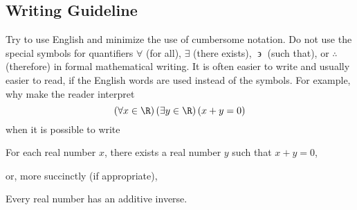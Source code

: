 \subsection*{Writing Guideline}
%
Try to use English and minimize the use of cumbersome notation.  Do not use the special symbols for quantifiers $\forall$ (for all), 
$\exists$ (there exists), $\mathrel\backepsilon$ (such that), or $\therefore $ (therefore) in formal mathematical writing.  It is often easier to write and usually easier to read, if the English words are used instead of the symbols.  For example, why make the reader interpret
\[
\left( \forall x \in \R \right) \left( \exists y \in \R \right)\left( x + y = 0 \right)
\]
when it is possible to write
\begin{center}
For each real number $x$, there exists a real number $y$ such that $x + y = 0$,
\end{center}
or, more succinctly (if appropriate),
\begin{center}
Every real number has an additive inverse.
\end{center}
\hbreak

\endinput

